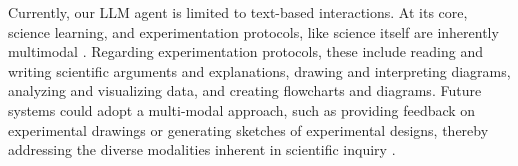 Currently, our LLM agent is limited to text-based interactions. At its core, science learning, and experimentation protocols, like science itself are inherently multimodal \citep{lemke_literacies_2004, kress_vanleeuwen_1990}. Regarding experimentation protocols, these include reading and writing scientific arguments and explanations, drawing and interpreting diagrams, analyzing and visualizing data, and creating flowcharts and diagrams.  
Future systems could adopt a multi-modal approach, such as providing feedback on experimental drawings or generating sketches of experimental designs, thereby addressing the diverse modalities inherent in scientific inquiry \citep{lee2023multimodality, bewersdorff2024taking}.

